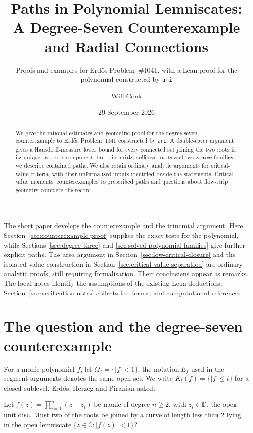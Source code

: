 \documentclass[11pt]{article}
\title{Paths in Polynomial Lemniscates:\\A Degree-Seven Counterexample and Radial Connections}
\subtitle{Proofs and examples for Erd\H{o}s Problem~\#1041, with a Lean proof for the polynomial constructed by \texttt{ani}}
\author{Will Cook}
\date{29 September 2026}
\newcommand{\dbar}{\mathbb{D}}
\begin{document}
\maketitle
\noteprovenance

\begin{abstract}
We give the rational estimates and geometric proof for the degree-seven
counterexample to Erd\H{o}s Problem~1041 constructed by \texttt{ani}.
A double-cover argument gives a Hausdorff-measure lower bound for every
connected set joining the two roots in its unique two-root component. For trinomials,
collinear roots and two sparse families we describe contained paths.
We also retain ordinary analytic arguments for critical-value criteria,
with their unformalised inputs identified beside the statements.
Critical-value moments, counterexamples to prescribed paths and
questions about flow-strip geometry complete the record.
\end{abstract}

The \href{erdos-1041-lemniscate-newton-flow.pdf}{short paper} develops the
counterexample and the trinomial argument. Here
Section~\ref{sec:counterexample-proof} supplies the exact tests for the
polynomial, while Sections~\ref{sec:degree-three} and
\ref{sec:solved-polynomial-families} give further explicit paths.
The area argument in Section~\ref{sec:low-critical-closure} and the
isolated-value construction in Section~\ref{sec:critical-value-separation}
are ordinary analytic proofs, still requiring formalisation. Their
conclusions appear as remarks. The local notes identify the assumptions
of the existing Lean deductions; Section~\ref{sec:verification-notes}
collects the formal and computational references.

\section{The question and the degree-seven counterexample}\label{sec:problem}

For a monic polynomial $f$, let $\Omega_f=\{|f|<1\}$; the notation
$E_f$ used in the segment arguments denotes the same open set. We write
$K_t(f)=\{|f|\le t\}$ for a closed sublevel. Erd\H{o}s, Herzog and Piranian \cite[Problem~5, p.~139]{ehp1958} asked:

\begin{problem}[Erd\H{o}s \#1041]\label{res:problem}
Let $f(z)=\prod_{i=1}^{n}(z-z_i)$ be monic of degree $n\ge2$, with
$z_i\in\dbar$, the open unit disc.  Must two of the roots be joined by a curve of length less than
$2$ lying in the open lemniscate $\{z\in\mathbb{C}:|f(z)|<1\}$?
\end{problem}
\end{document}
